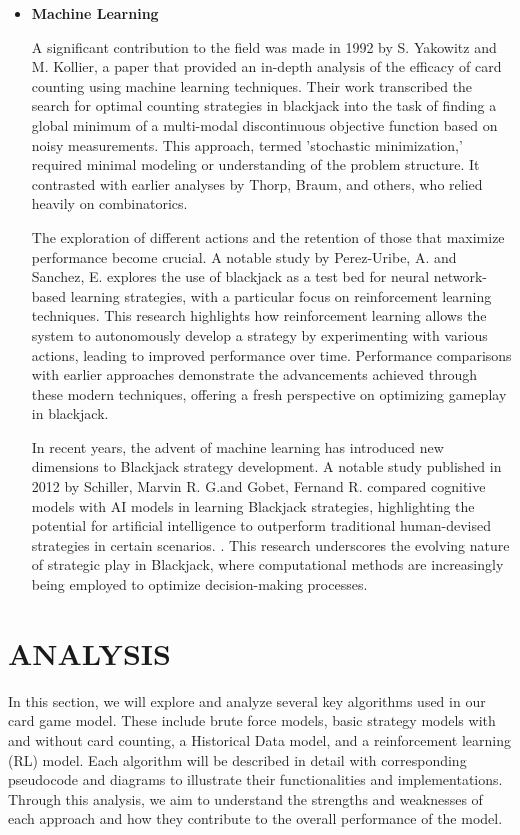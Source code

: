 \documentclass[a4paper,12pt]{report}
\begin{document}
\begin{itemize}
\item {\textbf{Machine Learning}}

A significant contribution to the field was made in 1992 by S. Yakowitz and M. Kollier, a paper that provided an in-depth analysis of the efficacy of card counting using machine learning techniques.\cite{paper:6} Their work transcribed the search for optimal counting strategies in blackjack into the task of finding a global minimum of a multi-modal discontinuous objective function based on noisy measurements. This approach, termed 'stochastic minimization,' required minimal modeling or understanding of the problem structure. It contrasted with earlier analyses by Thorp, Braum, and others, who relied heavily on combinatorics.

The exploration of different actions and the retention of those that maximize performance become crucial. A notable study by Perez-Uribe, A. and Sanchez, E. explores the use of blackjack as a test bed for neural network-based learning strategies, with a particular focus on reinforcement learning techniques.\cite{paper:7} This research highlights how reinforcement learning allows the system to autonomously develop a strategy by experimenting with various actions, leading to improved performance over time. Performance comparisons with earlier approaches demonstrate the advancements achieved through these modern techniques, offering a fresh perspective on optimizing gameplay in blackjack.

In recent years, the advent of machine learning has introduced new dimensions to Blackjack strategy development. A notable study published in 2012 by Schiller, Marvin R. G.and Gobet, Fernand R. compared cognitive models with AI models in learning Blackjack strategies, highlighting the potential for artificial intelligence to outperform traditional human-devised strategies in certain scenarios. \cite{paper:5}. This research underscores the evolving nature of strategic play in Blackjack, where computational methods are increasingly being employed to optimize decision-making processes.


\end{itemize}


\chapter{ANALYSIS}
\label{analysis}
In this section, we will explore and analyze several key algorithms used in our card game model. These include brute force models, basic strategy models with and without card counting, a Historical Data model, and a reinforcement learning (RL) model. Each algorithm will be described in detail with corresponding pseudocode and diagrams to illustrate their functionalities and implementations. Through this analysis, we aim to understand the strengths and weaknesses of each approach and how they contribute to the overall performance of the model.
\end{document}
